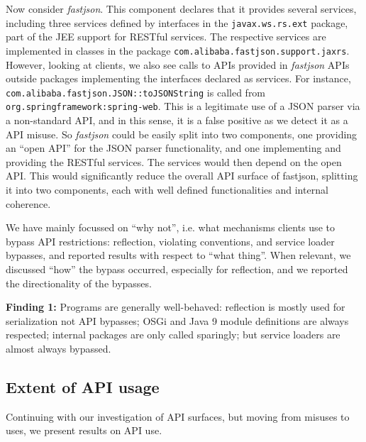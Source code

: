 Now consider \emph{fastjson}. This component declares that it provides several services, including three services defined by interfaces in the \texttt{javax.ws.rs.ext} package, part of the JEE support for RESTful services. 
The respective services are implemented in classes in the package \texttt{com.alibaba.fastjson.support.jaxrs}.   
However, looking at clients, we also see calls to APIs provided in \emph{fastjson} APIs outside packages implementing the interfaces declared as services. For instance, \texttt{com.alibaba.fastjson.JSON::toJSONString} is called from \texttt{org.springframework:spring-web}.
This is a legitimate use of a JSON parser via a non-standard API, and in this sense, it is a false positive as we detect it as a API misuse. So \emph{fastjson} could be easily split into two components, one providing an ``open API'' for the JSON parser functionality, and one implementing and providing the RESTful services. The services would then depend on the open API. This would significantly reduce the overall API surface of fastjson, splitting it into two components, each with well defined functionalities and internal coherence.

We have mainly focussed on ``why not'', i.e. what mechanisms clients use to bypass API restrictions: reflection, violating conventions, and service loader bypasses, and reported results with respect to ``what thing''. When relevant, we discussed ``how'' the bypass occurred, especially for reflection, and we reported the directionality of the bypasses.

\begin{mdframed}[
  leftmargin=\parindent,
  rightmargin=\parindent,
  skipabove=\topsep,
  skipbelow=\topsep
  ]
{\bf Finding 1:} Programs are generally well-behaved: reflection is mostly used for serialization not API bypasses; OSGi and Java 9 module definitions are always respected; internal packages are only called sparingly; but service loaders are almost always bypassed.
\end{mdframed}

\subsection{Extent of API usage}
Continuing with our investigation of API surfaces, but moving from
misuses to uses, we present results on API use.

